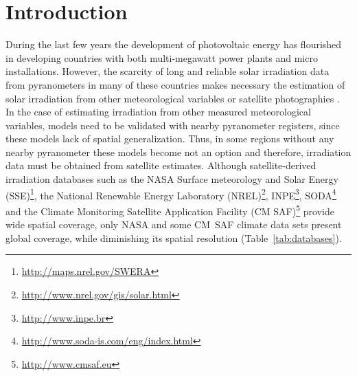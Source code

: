 \documentclass[authoryear, sort&compress]{elsarticle}
\begin{document}
\section{Introduction}

During the last few years the development of photovoltaic energy has
flourished in developing countries with both multi-megawatt power
plants and micro installations. However, the scarcity of long and
reliable solar irradiation data from pyranometers in many of these
countries makes necessary the estimation of solar irradiation from
other meteorological variables or satellite photographies
\citep{Schulz.Albert.ea2009}. In the case of estimating irradiation
from other measured meteorological variables, models need to be
validated with nearby pyranometer registers, since these models lack
of spatial generalization.
Thus, in some regions without any nearby pyranometer these models
become not an option and therefore, irradiation data must be obtained
from satellite estimates. Although satellite-derived irradiation
databases such as the NASA Surface meteorology and Solar Energy
(SSE)\footnote{\url{http://maps.nrel.gov/SWERA}}, the National
Renewable Energy Laboratory
(NREL)\footnote{\url{http://www.nrel.gov/gis/solar.html}},
INPE\footnote{\url{http://www.inpe.br}},
SODA\footnote{\url{http://www.soda-is.com/eng/index.html}} and the
Climate Monitoring Satellite Application Facility (CM
SAF)\footnote{\url{http://www.cmsaf.eu}} provide wide spatial
coverage, only NASA and some CM~SAF climate data sets present global
coverage, while diminishing its spatial resolution
(Table~\ref{tab:databases}).
\end{document}
